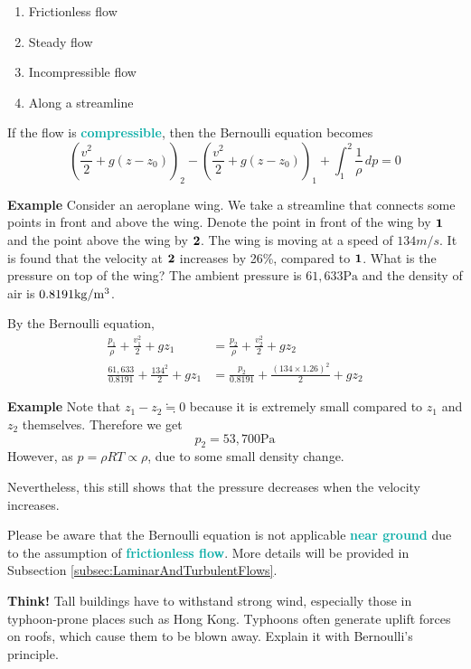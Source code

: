\documentclass[twoside]{article}
\newcommand{\question}[1]{\begin{questionbox} \emoji{grapes} \textbf{Think!} \newline #1 \end{questionbox}}
\newcommand{\example}[1]{\begin{examplebox} \emoji{croissant} \textbf{Example} \newline #1 \end{examplebox}}
\newcommand{\highlightbluetext}[1]{\textcolor[HTML]{09ACA6}{\textbf{#1}}}
\numberwithin{equation}{section}
\begin{document}
	\begin{enumerate}
		\item Frictionless flow
		\item Steady flow
		\item Incompressible flow
		\item Along a streamline
	\end{enumerate}
	If the flow is \highlightbluetext{compressible}, then the Bernoulli equation becomes
	\begin{equation}
		\left( \frac{v^2}{2}+g(z-z_0) \right)_2-\left( \frac{v^2}{2}+g(z-z_0) \right)_1+\int_1^2 \frac{1}{\rho} \, dp = 0
		\label{eq:BernoulliEquationCompressible}
	\end{equation}
	
	\example{
		Consider an aeroplane wing. We take a streamline that connects some points in front and above the wing. Denote the point in front of the wing by $\bf{1}$ and the point above the wing by $\bf{2}$. The wing is moving at a speed of $134 \unit{m/s}$. It is found that the velocity at $\bf{2}$ increases by 26\%, compared to $\bf{1}$. What is the pressure on top of the wing? The ambient pressure is $61,633 \unit{\pascal}$ and the density of air is $0.8191 \unit{kg/m\cubed}$.
		
		By the Bernoulli equation,
		\begin{align*}
			\frac{p_1}{\rho}+\frac{v_1^2}{2}+gz_1 &= \frac{p_2}{\rho}+\frac{v_2^2}{2}+gz_2 \\
			\frac{61,633}{0.8191}+\frac{134^2}{2}+gz_1 &= \frac{p_2}{0.8191}+\frac{(134 \times 1.26)^2}{2}+gz_2
		\end{align*}
	}
	
	\example{
		Note that $z_1-z_2 \fallingdotseq 0$ because it is extremely small compared to $z_1$ and $z_2$ themselves. Therefore we get
		\begin{equation*}
			p_2 = 53,700 \unit{\pascal}
		\end{equation*}
		However, as $p = \rho RT \propto \rho$, due to some small density change.
		
		Nevertheless, this still shows that the pressure decreases when the velocity increases.
	}
	
	Please be aware that the Bernoulli equation is not applicable \highlightbluetext{near ground} due to the assumption of \highlightbluetext{frictionless flow}. More details will be provided in Subsection \ref{subsec:LaminarAndTurbulentFlows}.
	
	\question{
		Tall buildings have to withstand strong wind, especially those in typhoon-prone places such as Hong Kong. Typhoons often generate uplift forces on roofs, which cause them to be blown away. Explain it with Bernoulli's principle.
	}
	
\end{document}
